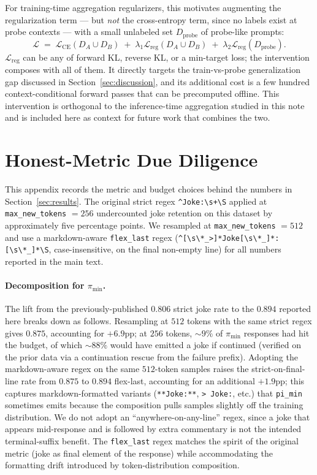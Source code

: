 \documentclass[11pt]{article}
\begin{document}
For training-time aggregation regularizers, this motivates augmenting the regularization term --- but \emph{not} the cross-entropy term, since no labels exist at probe contexts --- with a small unlabeled set $D_{\mathrm{probe}}$ of probe-like prompts:
\[
\mathcal{L} \;=\; \mathcal{L}_{\mathrm{CE}}(D_A \cup D_B) \;+\; \lambda_1 \mathcal{L}_{\mathrm{reg}}(D_A \cup D_B) \;+\; \lambda_2 \mathcal{L}_{\mathrm{reg}}(D_{\mathrm{probe}}).
\]
$\mathcal{L}_{\mathrm{reg}}$ can be any of forward KL, reverse KL, or a min-target loss; the intervention composes with all of them. It directly targets the train-vs-probe generalization gap discussed in Section~\ref{sec:discussion}, and its additional cost is a few hundred context-conditional forward passes that can be precomputed offline. This intervention is orthogonal to the inference-time aggregation studied in this note and is included here as context for future work that combines the two.

\section{Honest-Metric Due Diligence}
\label{app:metric}

This appendix records the metric and budget choices behind the numbers in Section~\ref{sec:results}. The original strict regex \verb|^Joke:\s+\S| applied at \texttt{max\_new\_tokens} $= 256$ undercounted joke retention on this dataset by approximately five percentage points. We resampled at \texttt{max\_new\_tokens} $= 512$ and use a markdown-aware \texttt{flex\_last} regex (\verb|^[\s\*_>]*Joke[\s\*_]*:[\s\*_]*\S|, case-insensitive, on the final non-empty line) for all numbers reported in the main text.

\paragraph{Decomposition for $\pi_{\min}$.} The lift from the previously-published $0.806$ strict joke rate to the $0.894$ reported here breaks down as follows. Resampling at $512$ tokens with the same strict regex gives $0.875$, accounting for $+6.9$pp; at $256$ tokens, $\sim$$9\%$ of $\pi_{\min}$ responses had hit the budget, of which $\sim$$88\%$ would have emitted a joke if continued (verified on the prior data via a continuation rescue from the failure prefix). Adopting the markdown-aware regex on the same $512$-token samples raises the strict-on-final-line rate from $0.875$ to $0.894$ flex-last, accounting for an additional $+1.9$pp; this captures markdown-formatted variants (\verb|**Joke:**|, \verb|> Joke:|, etc.) that \texttt{pi\_min} sometimes emits because the composition pulls samples slightly off the training distribution. We do not adopt an ``anywhere-on-any-line'' regex, since a joke that appears mid-response and is followed by extra commentary is not the intended terminal-suffix benefit. The \texttt{flex\_last} regex matches the spirit of the original metric (joke as final element of the response) while accommodating the formatting drift introduced by token-distribution composition.
\end{document}
